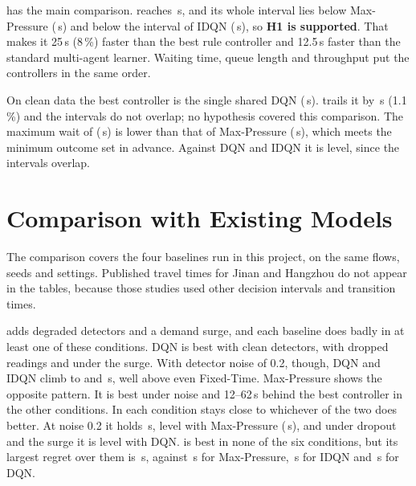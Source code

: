  has the main comparison. \ugmarl{} reaches \,s, and
its whole interval lies below Max-Pressure (\,s) and below the
interval of IDQN (\,s), so \textbf{H1 is supported}. That makes it 25\,s
(8\,\%) faster than the best rule controller and 12.5\,s faster than the standard multi-agent
learner. Waiting time, queue length and throughput put the controllers in the same order.

On clean data the best controller is the single shared DQN (\,s).
\ugmarl{} trails it by \,s (1.1\,\%) and the intervals do not
overlap; no hypothesis covered this comparison. The maximum wait of \ugmarl{} (\,s) is lower than that of
Max-Pressure (\,s), which meets the minimum outcome set in
advance. Against DQN and IDQN it is level, since the intervals overlap.

\section{Comparison with Existing Models}
\label{sec:comparison}

\begin{table}[t]
\centering\footnotesize
\setlength{\tabcolsep}{3.4pt}
\caption[Travel time under six test conditions and worst-case regret]{Average travel time (s) on the Jinan test flow under six conditions, mean $\pm$
std over 5 seeds. Regret = largest gap to the best of the five controllers over the
conditions. Bold: best of the five controllers in the column.}
\label{tab:robust}

\end{table}

The comparison covers the four baselines run in this project, on the same flows, seeds and
settings. Published travel times for Jinan and Hangzhou do not appear in the tables, because
those studies used other decision intervals and transition times.

 adds degraded detectors and a demand surge, and each baseline does
badly in at least one of these conditions. DQN is best with clean detectors, with dropped
readings and under the surge. With detector noise of 0.2, though, DQN and IDQN climb to
 and \,s, well above even Fixed-Time.
Max-Pressure shows the opposite pattern. It is best under noise and 12--62\,s behind the best
controller in the other conditions. In each condition \ugmarl{} stays close to whichever of the
two does better. At noise 0.2 it holds \,s, level with Max-Pressure
(\,s), and under dropout and the surge it is level with DQN.
\ugmarl{} is best in none of the six conditions, but its largest regret over them is
\,s, against \,s for
Max-Pressure, \,s for IDQN and \,s for DQN.

